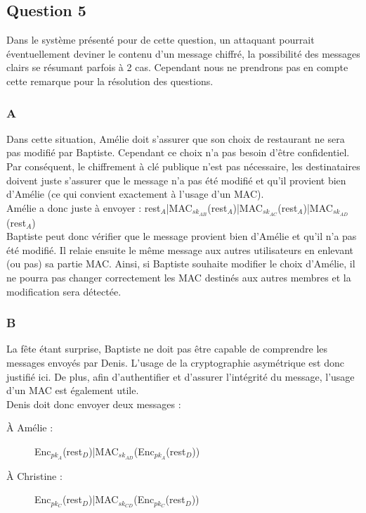 \documentclass[a4paper, 11pt, oneside]{article}
\begin{document}
\subsection{Question 5}

Dans le système présenté pour de cette question, un attaquant pourrait éventuellement deviner le contenu d'un message chiffré, la possibilité des messages clairs se résumant parfois à 2 cas. Cependant nous ne prendrons pas en compte cette remarque pour la résolution des questions.

\subsubsection{A}

Dans cette situation, Amélie doit s'assurer que son choix de restaurant ne sera pas modifié par Baptiste. Cependant ce choix n'a pas besoin d'être confidentiel.
Par conséquent, le chiffrement à clé publique n'est pas nécessaire, les destinataires doivent juste s'assurer que le message n'a pas été modifié et qu'il provient bien d'Amélie (ce qui convient exactement à l'usage d'un MAC).\\[5pt]
Amélie a donc juste à envoyer : rest$_{A}$|MAC$_{sk_{AB}}$(rest$_{A}$)|MAC$_{sk_{AC}}$(rest$_{A}$)|MAC$_{sk_{AD}}$(rest$_{A}$)\\[5pt]
Baptiste peut donc vérifier que le message provient bien d'Amélie et qu'il n'a pas été modifié. Il relaie ensuite le même message aux autres utilisateurs en enlevant (ou pas) sa partie MAC.
Ainsi, si Baptiste souhaite modifier le choix d'Amélie, il ne pourra pas changer correctement les MAC destinés aux autres membres et la modification sera détectée.

\subsubsection{B}

La fête étant surprise, Baptiste ne doit pas être capable de comprendre les messages envoyés par Denis. L'usage de la cryptographie asymétrique est donc justifié ici. De plus, afin d'authentifier et d'assurer l'intégrité du message, l'usage d'un MAC est également utile.\\[5pt]
Denis doit donc envoyer deux messages : 

\begin{description}
 \item[À Amélie : ] Enc$_{pk_{A}}$(rest$_{D}$)|MAC$_{sk_{AD}}$(Enc$_{pk_{A}}$(rest$_{D}$))
 \item[À Christine : ] Enc$_{pk_{C}}$(rest$_{D}$)|MAC$_{sk_{CD}}$(Enc$_{pk_{C}}$(rest$_{D}$))
\end{description}
\vspace{5pt}
\end{document}

